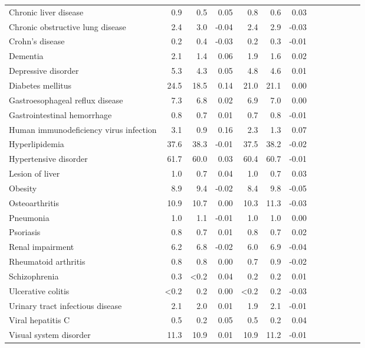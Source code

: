 \documentclass[11pt,]{article}
\begin{document}
\begin{longtable}{lrrrrrrrrrrrr}
      Chronic liver disease &  0.9 &  0.5 &  0.05 &  0.8 &  0.6 &  0.03 \\ 
      Chronic obstructive lung disease &  2.4 &  3.0 & -0.04 &  2.4 &  2.9 & -0.03 \\ 
      Crohn's disease &  0.2 &  0.4 & -0.03 &  0.2 &  0.3 & -0.01 \\ 
      Dementia &  2.1 &  1.4 &  0.06 &  1.9 &  1.6 &  0.02 \\ 
      Depressive disorder &  5.3 &  4.3 &  0.05 &  4.8 &  4.6 &  0.01 \\ 
      Diabetes mellitus & 24.5 & 18.5 &  0.14 & 21.0 & 21.1 &  0.00 \\ 
      Gastroesophageal reflux disease &  7.3 &  6.8 &  0.02 &  6.9 &  7.0 &  0.00 \\ 
      Gastrointestinal hemorrhage &  0.8 &  0.7 &  0.01 &  0.7 &  0.8 & -0.01 \\ 
      Human immunodeficiency virus infection &  3.1 &  0.9 &  0.16 &  2.3 &  1.3 &  0.07 \\ 
      Hyperlipidemia & 37.6 & 38.3 & -0.01 & 37.5 & 38.2 & -0.02 \\ 
      Hypertensive disorder & 61.7 & 60.0 &  0.03 & 60.4 & 60.7 & -0.01 \\ 
      Lesion of liver &  1.0 &  0.7 &  0.04 &  1.0 &  0.7 &  0.03 \\ 
      Obesity &  8.9 &  9.4 & -0.02 &  8.4 &  9.8 & -0.05 \\ 
      Osteoarthritis & 10.9 & 10.7 &  0.00 & 10.3 & 11.3 & -0.03 \\ 
      Pneumonia &  1.0 &  1.1 & -0.01 &  1.0 &  1.0 &  0.00 \\ 
      Psoriasis &  0.8 &  0.7 &  0.01 &  0.8 &  0.7 &  0.02 \\ 
      Renal impairment &  6.2 &  6.8 & -0.02 &  6.0 &  6.9 & -0.04 \\ 
      Rheumatoid arthritis &  0.8 &  0.8 &  0.00 &  0.7 &  0.9 & -0.02 \\ 
      Schizophrenia &  0.3 & <0.2 &  0.04 &  0.2 &  0.2 &  0.01 \\ 
      Ulcerative colitis & <0.2 &  0.2 &  0.00 & <0.2 &  0.2 & -0.03 \\ 
      Urinary tract infectious disease &  2.1 &  2.0 &  0.01 &  1.9 &  2.1 & -0.01 \\ 
      Viral hepatitis C &  0.5 &  0.2 &  0.05 &  0.5 &  0.2 &  0.04 \\ 
      Visual system disorder & 11.3 & 10.9 &  0.01 & 10.9 & 11.2 & -0.01 \\ 

\end{longtable}
\end{document}
